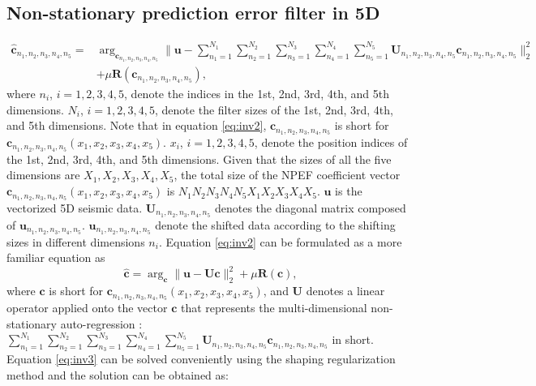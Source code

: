 \subsection{Non-stationary prediction error filter in 5D}
\begin{equation}
\label{eq:inv2}
\begin{split}
\hat{\mathbf{c}}_{n_1,n_2,n_3,n_4,n_5} = &\arg_{\mathbf{c}_{n_1,n_2,n_3,n_4,n_5}} \parallel \mathbf{u} - \sum_{n_1=1}^{N_1}\sum_{n_2=1}^{N_2} \sum_{n_3=1}^{N_3}\sum_{n_4=1}^{N_4}\sum_{n_5=1}^{N_5}\mathbf{U}_{n_1,n_2,n_3,n_4,n_5}\mathbf{c}_{n_1,n_2,n_3,n_4,n_5} \parallel_2^2 \\
&+\mu \mathbf{R}(\mathbf{c}_{n_1,n_2,n_3,n_4,n_5}),
\end{split}
\end{equation}
where $n_i$, $i=1,2,3,4,5$, denote the indices in the 1st, 2nd, 3rd, 4th, and 5th dimensions. $N_i$, $i=1,2,3,4,5$, denote the filter sizes of the 1st, 2nd, 3rd, 4th, and 5th dimensions. Note that in equation \ref{eq:inv2}, $\mathbf{c}_{n_1,n_2,n_3,n_4,n_5}$ is short for $\mathbf{c}_{n_1,n_2,n_3,n_4,n_5}(x_1,x_2,x_3,x_4,x_5)$. $x_i$, $i=1,2,3,4,5$, denote the position indices of the  1st, 2nd, 3rd, 4th, and 5th dimensions. Given that the sizes of all the five dimensions are $X_1,X_2,X_3,X_4,X_5$, the total size of the NPEF coefficient vector $\mathbf{c}_{n_1,n_2,n_3,n_4,n_5}(x_1,x_2,x_3,x_4,x_5)$ is $N_1N_2N_3N_4N_5X_1X_2X_3X_4X_5$. $\mathbf{u}$ is the vectorized 5D seismic data. $\mathbf{U}_{n_1,n_2,n_3,n_4,n_5}$ denotes the diagonal matrix composed of $\mathbf{u}_{n_1,n_2,n_3,n_4,n_5}$. $\mathbf{u}_{n_1,n_2,n_3,n_4,n_5}$ denote the shifted data according to the shifting sizes in different dimensions $n_i$. Equation \ref{eq:inv2} can be formulated as a more familiar equation as
\begin{equation}
\label{eq:inv3}
\hat{\mathbf{c}} = \arg_{\mathbf{c}} \parallel \mathbf{u} - \mathbf{U}\mathbf{c} \parallel_2^2 +\mu \mathbf{R}(\mathbf{c}),
\end{equation}
where $\mathbf{c}$ is short for $\mathbf{c}_{n_1,n_2,n_3,n_4,n_5}(x_1,x_2,x_3,x_4,x_5)$, and $\mathbf{U}$ denotes a linear operator applied onto the vector $\mathbf{c}$ that represents the multi-dimensional non-stationary auto-regression \cite[]{fomel20132}: $\sum_{n_1=1}^{N_1}\sum_{n_2=1}^{N_2} \sum_{n_3=1}^{N_3}\sum_{n_4=1}^{N_4}\sum_{n_5=1}^{N_5}\mathbf{U}_{n_1,n_2,n_3,n_4,n_5}\mathbf{c}_{n_1,n_2,n_3,n_4,n_5}$ in short. Equation \ref{eq:inv3} can be solved conveniently using the shaping regularization method \cite[]{fomel2007shape} and the solution can be obtained as:

